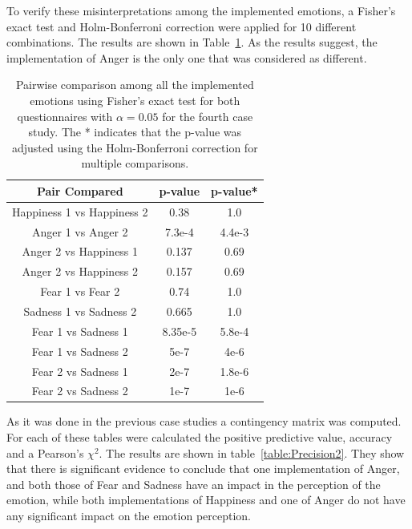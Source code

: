 To verify these misinterpretations among the implemented emotions, a Fisher's exact test and Holm-Bonferroni correction were applied for 10 different combinations. The results are shown in Table~\ref{table:result_compare_fourth}. As the results suggest, the implementation of Anger is the only one that was considered as different.

\begin{table}[h]
\centering
\small
\caption{Pairwise comparison among all the implemented emotions using Fisher's exact test for both questionnaires with $\alpha = 0.05$ for the fourth case study. The * indicates that the p-value was adjusted using the Holm-Bonferroni correction for multiple comparisons.}
		\label{table:result_compare_fourth}
		\begin{tabular}{|c|c|c|}
			\hline	
\textbf{Pair Compared} & \textbf{p-value} & \textbf{p-value*}\\	
			\hline
			Happiness 1 vs Happiness 2 &0.38&1.0\\
			\hline
			Anger 1 vs Anger 2 & 7.3e-4&4.4e-3\\
			\hline
			Anger 2 vs Happiness 1 & 0.137&0.69\\
			\hline
			Anger 2 vs Happiness 2 & 0.157&0.69\\
			\hline
			Fear 1 vs Fear 2 & 0.74&1.0\\
			\hline
			Sadness 1 vs Sadness 2 & 0.665&1.0\\
			\hline
			Fear 1 vs Sadness 1& 8.35e-5&5.8e-4\\
			\hline
			Fear 1 vs Sadness 2 & 5e-7&4e-6\\
			\hline
			Fear 2 vs Sadness 1 & 2e-7&1.8e-6\\
			\hline
			Fear 2 vs Sadness 2 & 1e-7&1e-6\\
			\hline
			\end{tabular}
\end{table}
 
As it was done in the previous case studies a contingency matrix was computed.
For each of these tables were calculated the positive predictive value, accuracy and a Pearson's $\chi^2$. The results are shown in table~\ref{table:Precision2}. They show that there is significant evidence to conclude that one implementation of Anger, and both those of Fear and Sadness have an impact in the perception of the emotion, while both implementations of Happiness and one of Anger do not have any significant impact on the emotion perception.

